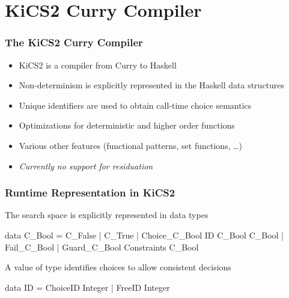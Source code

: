 \documentclass[
,xcolor=dvipsnames
]{beamer}
\newcommand{\blocktitle}[1]{%
{\medskip\usebeamerfont{subtitle}\usebeamercolor[fg]{subtitle}#1\smallskip}
}
\begin{document}
% 
% 
% 
% 
% 


\section{KiCS2 Curry Compiler}

\begin{frame}[fragile]%
\frametitle{The KiCS2 Curry Compiler}
\begin{itemize}
\item KiCS2 is a compiler from Curry to Haskell
\item Non-determinism is explicitly represented in
      the Haskell data structures
\item Unique identifiers are used to obtain
      call-time choice semantics
\item Optimizations for deterministic and higher order functions
\item Various other features (functional patterns, set functions, \dots)
\item \emph{Currently no support for residuation}
\end{itemize}
\end{frame}

\begin{frame}[fragile]%
\frametitle{Runtime Representation in KiCS2}

The search space is explicitly represented in data types
\begin{haskell}
data C_Bool
  = C_False
  | C_True
  | Choice_C_Bool ID C_Bool C_Bool
  | Fail_C_Bool
  | Guard_C_Bool Constraints C_Bool
\end{haskell}

A value of type  identifies choices to allow consistent decisions
\begin{haskell}
data ID = ChoiceID Integer
        | FreeID Integer
\end{haskell}
\end{frame}
\end{document}
